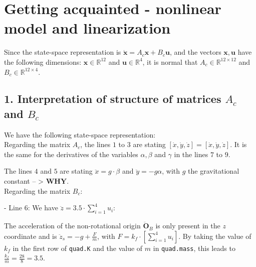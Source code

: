 \documentclass[a4paper]{report}
\begin{document}
\thispagestyle{fancy}
\rhead{\today}

\section*{Getting acquainted - nonlinear model and linearization}

Since the state-space representation is $\dot{\bm{x}} = A_c \bm{x} + B_c \bm{u}$, and the vectors $\bm{x}, \bm{u}$ have the following dimensions: $\bm{x} \in \mathbb{R}^{12}$ and $\bm{u} \in \mathbb{R}^{4}$, it is normal that $A_c \in \mathbb{R}^{12 \times 12}$ and $B_c \in \mathbb{R}^{12 \times 4}$.

\subsection*{1. Interpretation of structure of matrices $A_c$ and $B_c$}

We have the following state-space representation: \\

Regarding the matrix $A_c$, the lines $1$ to $3$ are stating $[\dot{x}, \dot{y}, \dot{z}] = [\dot{x}, \dot{y}, \dot{z}]$. It is the same for the derivatives of the variables $\alpha, \beta$ and $\gamma$ in the lines $7$ to $9$. \par
The lines $4$ and $5$ are stating $\ddot{x} = g \cdot \beta$ and $\ddot{y} = -g \alpha$, with $g$ the gravitational constant -- > $\bm{WHY}$. \\

Regarding the matrix $B_c$: \par
- Line $6$: We have $\ddot{z} = 3.5 \cdot \sum_{i = 1}^4 u_i$: \par
The acceleration of the non-rotational origin $\ddot{\bm{O}}_B$ is only present in the $z$ coordinate and is $\ddot{z}_s = -g + \frac{F}{m}$, with $F = k_f \cdot [\sum_{i = 1}^{4} u_i]$. By taking the value of $k_f$ in the first row of \texttt{quad.K} and the value of $m$ in \texttt{quad.mass}, this leads to $\frac{k_f}{m} = \frac{28}{8} = 3.5$. \\
\end{document}
